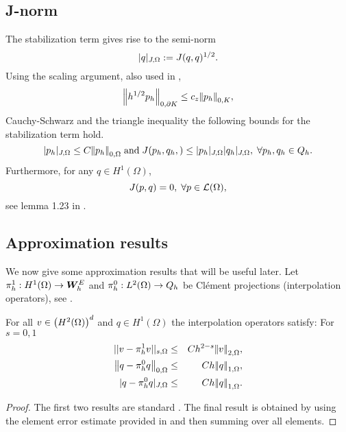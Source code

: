 \subsection{J-norm}
The stabilization term gives rise to the semi-norm 
\begin{equation*}
|{q}|_{J,\Omega}:=J(q,q)^{1/2}.
\end{equation*}
Using the scaling argument, also used in \citet{burman2007unified}, 
\begin{equation}
\label{eqn:scaling_arg}
{\left\vert\kern-0.25ex\left\vert h^{1/2}   {p_h} \right\vert\kern-0.25ex\right\vert}_{0,\partial K} \leq c_{z} {\left\vert\kern-0.25ex\left\vert   {p_h} \right\vert\kern-0.25ex\right\vert}_{0,K},
\end{equation}
Cauchy-Schwarz and the triangle inequality the following bounds for the stabilization term hold.
\begin{equation}
\label{J_bound}
|{p_h}|_{J,\Omega} \leq C{\left\vert\kern-0.25ex\left\vert p_h \right\vert\kern-0.25ex\right\vert}_{0,\Omega} \; \mbox{and} \; 
J(p_h,{q}_{h},)  \leq  |{p_h}|_{J,\Omega}|{{q}_{h}}|_{J,\Omega}, \; \forall  p_h, q_h \in {Q}_{h}.
\end{equation}
Furthermore, for any   $q \in H^{1}(\Omega)$,
\begin{equation}
\label{zero_jump}
J(p,q) = 0 , \; \forall p \in \mathcal{L}(\Omega) ,
\end{equation}
see lemma 1.23 in \cite{di2011mathematical}.



\subsection{Approximation results}
We now give some approximation results that will be useful later. Let $\pi_{h}^{1}:  H^{1}(\Omega) \rightarrow \boldsymbol{W}^{E}_{h}$ and $\pi_{h}^{0}: L^2(\Omega) \rightarrow {Q}_{h}$  be Cl\'ement projections (interpolation operators), see \cite{ciarlet2002}.
\begin{lemma}
\label{interp_error}
For all ${\bf v} \in \left( H^{2}(\Omega) \right)^{d}$ and  $q \in  H^{1}(\Omega)$ the interpolation operators satisfy: For $s=0,1$
\begin{eqnarray}
||{{\bf v} - \projlinear {\bf v}}||_{s,\Omega} & \leq & Ch^{2-s} \htwonorm{{\bf v}},  \\
 \ltwonorm{q - \projconst q} & \leq & Ch \honenorm{q}, \\
 \jnorm{q - \projconst q} & \leq & Ch \honenorm{q}.
\end{eqnarray}
\end{lemma}
\begin{proof}
The first two results are standard \citet{brenner2008mathematical}. The final result is obtained by using the element error estimate provided in \cite{verfurth1998posteriori} and  then summing over all elements.
\end{proof}

